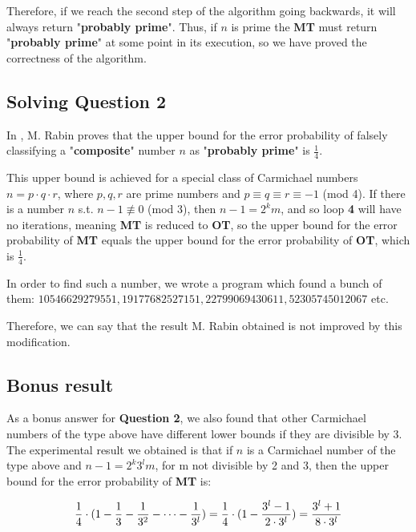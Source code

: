 \documentclass[11pt]{llncs}
\begin{document}
Therefore, if we reach the second step of the algorithm going backwards, it will always return "\textbf{probably prime}". Thus, if $n$ is prime the \textbf{MT} must return "\textbf{probably prime}" at some point in its execution, so we have proved the correctness of the algorithm.

\subsection{Solving Question 2}
In \cite{rabin}, M. Rabin proves that the upper bound for the error probability of falsely classifying a "\textbf{composite}" number $n$ as "\textbf{probably prime}" is $\frac{1}{4}$.

This upper bound is achieved for a special class of Carmichael numbers $n = p\cdot q\cdot r$, where $p, q, r$ are prime numbers and $p \equiv q \equiv r \equiv -1$ (mod 4). If there is a number $n$ s.t. $n-1 \not\equiv 0$ (mod 3), then $n - 1 = 2^km$, and so loop \textbf{4} will have no iterations, meaning \textbf{MT} is reduced to \textbf{OT}, so the upper bound for the error probability of \textbf{MT} equals the upper bound for the error probability of \textbf{OT}, which is $\frac{1}{4}$.

In order to find such a number, we wrote a program which found a bunch of them: $10546629279551, 19177682527151, 22799069430611, 52305745012067 $ etc. 

Therefore, we can say that the result M. Rabin obtained is not improved by this modification.

\newpage
\subsection{Bonus result}
As a bonus answer for \textbf{Question 2}, we also found that other Carmichael numbers of the type above have different lower bounds if they are divisible by 3. The experimental result we obtained is that if $n$ is a Carmichael number of the type above and $n-1 = 2^k3^lm$, for m not divisible by 2 and 3, then the upper bound for the error probability of \textbf{MT} is:

\[\frac{1}{4}\cdot (1 - \frac{1}{3} - \\
\frac{1}{3^2} - \dots - \frac{1}{3^l}) = \frac{1}{4}\cdot (1 - \frac{3^l - 1}{2\cdot 3^l}) = \frac{3^l+1}{8\cdot3^l}\]

\appendix
\end{document}
